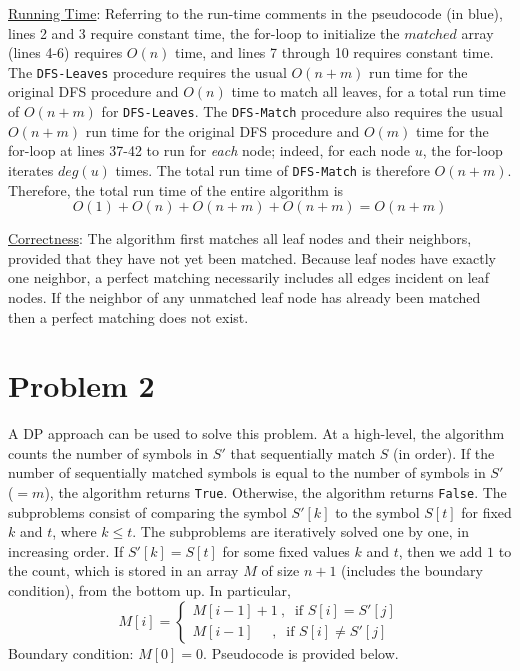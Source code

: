 \documentclass[twoside,11pt]{homework}
\begin{document}
\noindent
\underline{Running Time}:  Referring to the run-time comments in the pseudocode (in blue),  lines 2 and 3 require constant time,  the for-loop to initialize the $matched$ array (lines 4-6) requires $O(n)$ time,  and lines 7 through 10 requires constant time.  The \texttt{DFS-Leaves} procedure requires the usual $O(n+m)$ run time for the original DFS procedure and $O(n)$ time to match all leaves, for a total run time of $O(n+m)$ for \texttt{DFS-Leaves}.  The \texttt{DFS-Match} procedure also requires the usual $O(n+m)$ run time for the original DFS procedure and $O(m)$ time for the for-loop at lines 37-42 to run for \textit{each} node; indeed, for each node $u$, the for-loop iterates $deg(u)$ times. The total run time of \texttt{DFS-Match} is therefore $O(n+m)$. Therefore, the total run time of the entire algorithm is $$O(1) + O(n) + O(n+m) + O(n+m) = O(n+m)$$

\noindent
\underline{Correctness}:  %
The algorithm first matches all leaf nodes and their neighbors, provided that they have not yet been matched. Because leaf nodes have exactly one neighbor, a perfect matching necessarily includes all edges incident on leaf nodes.  If the neighbor of any unmatched leaf node has already been matched then a perfect matching does not exist.

\section*{Problem 2}
A DP approach can be used to solve this problem.  At a high-level,  the algorithm counts the number of symbols in $S'$ that sequentially match $S$ (in order).  If the number of sequentially matched symbols is equal to the number of symbols in $S'$ ($=m$), the algorithm returns \texttt{True}. Otherwise, the algorithm returns \texttt{False}.  The subproblems consist of comparing the symbol $S'[k]$ to the symbol $S[t]$ for fixed $k$ and $t$,  where $k \leq t$.  The subproblems are iteratively solved one by one,  in increasing order.  If $S'[k] = S[t]$ for some fixed values $k$ and $t$, then we add $1$ to the count, which is stored in an array $M$ of size $n+1$ (includes the boundary condition),  from the bottom up.  In particular, 
$$M[i] = 
\begin{cases}
M[i-1] + 1 \ ,  \ \textrm{ if }  S[i] = S'[j] \\
M[i-1] \ \ \ \ \ \ ,  \ \textrm{ if }  S[i] \neq S'[j]
\end{cases}
$$
Boundary condition:  $M[0] = 0$.  Pseudocode is provided below.
\end{document}
